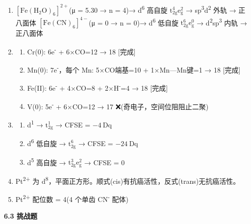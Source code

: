 \begin{enumerate}
\def\labelenumi{\arabic{enumi}.}
\setcounter{enumi}{4}
\item
  \textbf{\([\mathrm{Fe(H_2O)_6}]^{2+}\)}(μ = 5.30 → n = 4)→ d\textsuperscript{6} 高自旋 \(\mathrm{t_{2g}^4 e_g^2}\) → sp\textsuperscript{3}d\textsuperscript{2} 外轨 → 正八面体
  \textbf{\([\mathrm{Fe(CN)_6}]^{4-}\)}(μ = 0 → n = 0)→ d\textsuperscript{6} 低自旋 \(\mathrm{t_{2g}^6 e_g^0}\) → d\textsuperscript{2}sp\textsuperscript{3} 内轨 → 正八面体
\item
  \begin{enumerate}
  \def\labelenumii{(\arabic{enumii})}
  \tightlist
  \item
    Cr(0): 6e\textsuperscript{-} + 6×CO=12 → 18 {[}完成{]}
  \item
    Mn(0): 7e\textsuperscript{-}，每个 Mn: 5×CO端基=10 + 1×Mn---Mn键=1 → 18 {[}完成{]}
  \item
    Fe(II): 6e\textsuperscript{-} + 4×CO=8 + 2×H\textsuperscript{-}=4 → 18 {[}完成{]}
  \item
    V(0): 5e\textsuperscript{-} + 6×CO=12 → 17 ❌(奇电子，空间位阻阻止二聚)
  \end{enumerate}
\item
  \begin{enumerate}
  \def\labelenumii{(\arabic{enumii})}
  \tightlist
  \item
    d\textsuperscript{1} → \(\mathrm{t_{2g}^1}\) → CFSE = \(-4\ \mathrm{Dq}\)
  \item
    d\textsuperscript{6} 低自旋 → \(\mathrm{t_{2g}^6}\) → CFSE = \(-24\ \mathrm{Dq}\)
  \item
    d\textsuperscript{5} 高自旋 → \(\mathrm{t_{2g}^3 e_g^2}\) → CFSE = 0
  \end{enumerate}
\item
  Pt\textsuperscript{2+} 为 d\textsuperscript{8}，平面正方形。顺式(cis)有抗癌活性，反式(trans)无抗癌活性。
\item
  Pt\textsuperscript{2+} 配位数 = 4(4 个单齿 CN\textsuperscript{-} 配体)
\end{enumerate}

\textbf{6.3 挑战题}

